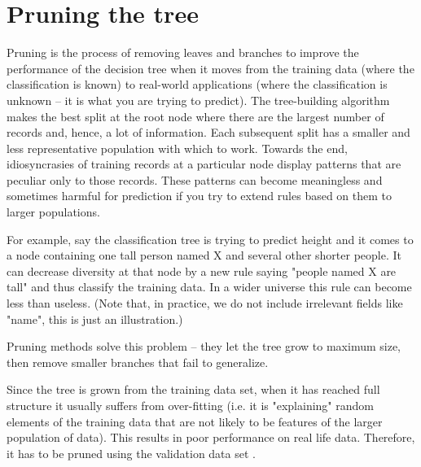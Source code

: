 \documentclass[caret-main.tex]{subfiles}
\begin{document}
\section{Pruning the tree}
Pruning is the process of removing leaves and branches to improve the performance of the decision tree when it moves from the training data (where the classification is known) to real-world applications (where the classification is unknown -- it is what you are trying to predict). The tree-building algorithm makes the best split at the root node where there are the largest number of records and, hence, a lot of information. Each subsequent split has a smaller and less representative population with which to work. Towards the end, idiosyncrasies of training records at a particular node display patterns that are peculiar only to those records. These patterns can become meaningless and sometimes harmful for prediction if you try to extend rules based on them to larger populations.

For example, say the classification tree is trying to predict height and it comes to a node containing one tall person named X and several other shorter people. It can decrease diversity at that node by a new rule saying "people named X are tall" and thus classify the training data. In a wider universe this rule can become less than useless. (Note that, in practice, we do not include irrelevant fields like "name", this is just an illustration.)

Pruning methods solve this problem -- they let the tree grow to maximum size, then remove smaller branches that fail to generalize.

Since the tree is grown from the training data set, when it has reached full structure it usually suffers from over-fitting (i.e. it is "explaining" random elements of the training data that are not likely to be features of the larger population of data). This results in poor performance on real life data. Therefore, it has to be pruned using the validation data set .
\end{document}
